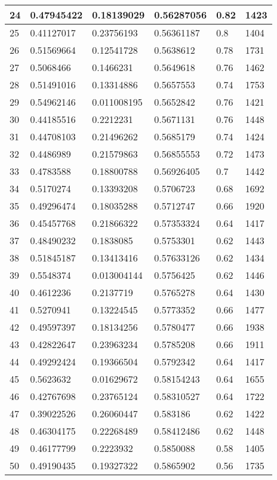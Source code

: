 \begin{longtable}{|l|l|l|l|l|l|}
24 & 0.47945422 & 0.18139029 & 0.56287056 & 0.82 & 1423 \\ \hline 
25 & 0.41127017 & 0.23756193 & 0.56361187 & 0.8 & 1404 \\ \hline 
26 & 0.51569664 & 0.12541728 & 0.5638612 & 0.78 & 1731 \\ \hline 
27 & 0.5068466 & 0.1466231 & 0.5649618 & 0.76 & 1462 \\ \hline 
28 & 0.51491016 & 0.13314886 & 0.5657553 & 0.74 & 1753 \\ \hline 
29 & 0.54962146 & 0.011008195 & 0.5652842 & 0.76 & 1421 \\ \hline 
30 & 0.44185516 & 0.2212231 & 0.5671131 & 0.76 & 1448 \\ \hline 
31 & 0.44708103 & 0.21496262 & 0.5685179 & 0.74 & 1424 \\ \hline 
32 & 0.4486989 & 0.21579863 & 0.56855553 & 0.72 & 1473 \\ \hline 
33 & 0.4783588 & 0.18800788 & 0.56926405 & 0.7 & 1442 \\ \hline 
34 & 0.5170274 & 0.13393208 & 0.5706723 & 0.68 & 1692 \\ \hline 
35 & 0.49296474 & 0.18035288 & 0.5712747 & 0.66 & 1920 \\ \hline 
36 & 0.45457768 & 0.21866322 & 0.57353324 & 0.64 & 1417 \\ \hline 
37 & 0.48490232 & 0.1838085 & 0.5753301 & 0.62 & 1443 \\ \hline 
38 & 0.51845187 & 0.13413416 & 0.57633126 & 0.62 & 1434 \\ \hline 
39 & 0.5548374 & 0.013004144 & 0.5756425 & 0.62 & 1446 \\ \hline 
40 & 0.4612236 & 0.2137719 & 0.5765278 & 0.64 & 1430 \\ \hline 
41 & 0.5270941 & 0.13224545 & 0.5773352 & 0.66 & 1477 \\ \hline 
42 & 0.49597397 & 0.18134256 & 0.5780477 & 0.66 & 1938 \\ \hline 
43 & 0.42822647 & 0.23963234 & 0.5785208 & 0.66 & 1911 \\ \hline 
44 & 0.49292424 & 0.19366504 & 0.5792342 & 0.64 & 1417 \\ \hline 
45 & 0.5623632 & 0.01629672 & 0.58154243 & 0.64 & 1655 \\ \hline 
46 & 0.42767698 & 0.23765124 & 0.58310527 & 0.64 & 1722 \\ \hline 
47 & 0.39022526 & 0.26060447 & 0.583186 & 0.62 & 1422 \\ \hline 
48 & 0.46304175 & 0.22268489 & 0.58412486 & 0.62 & 1448 \\ \hline 
49 & 0.46177799 & 0.2223932 & 0.5850088 & 0.58 & 1405 \\ \hline 
50 & 0.49190435 & 0.19327322 & 0.5865902 & 0.56 & 1735 \\ \hline 
\end{longtable}